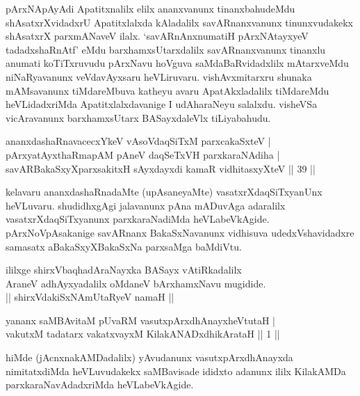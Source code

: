 {pArxNApAyAdi Apatitxnalilx elilx ananxvanunx tinanxbahudeMdu shAsatxrXvidadxrU Apatitxlalxda kAladalilx savARnanxvanunx tinunxvudakekx shAsatxrX parxmANaveV ilalx. `savARnAnxnumatiH pArxNAtayxyeV tadadxshaRnAtf' eMdu barxhamxsUtarxdalilx savARnanxvanunx tinanxlu anumati koTiTxruvudu pArxNavu hoVguva saMdaBaRvidadxlilx mAtarxveMdu niNaRyavanunx veVdavAyxsaru heVLiruvaru. vishAvxmitarxru shunaka mAMsavanunx tiMdareMbuva katheyu avaru ApatAkxladalilx tiMdareMdu heVLidadxriMda Apatitxlalxdavanige I udAharaNeyu salalxdu. visheVSa vicAravanunx barxhamxsUtarx BASayxdaleVlx tiLiyabahudu.}
\begin{shl}
\footnotemark[1]ananxdashaRnavacecxYkeV vAsoVdaqSiTxM parxcakaSxteV | \\
pArxyatAyxthaRmapAM pAneV daqSeTxVH parxkaraNAdiha | \\
savARBakaSxyXparxsakitxH sAyxdayxdi kamaR vidhitasxyXteV \hfill|| 39 || 
\end{shl}

\begin{artha}
kelavaru ananxdashaRnadaMte (upAsaneyaMte) vasatxrXdaqSiTxyanUnx 
heVLuvaru. shudidhxgAgi jalavanunx pAna mADuvAga adaralilx 
vasatxrXdaqSiTxyanunx parxkaraNadiMda heVLabeVkAgide. 
pArxNoVpAsakanige savARnanx BakaSxNavanunx vidhisuva udedxVshavidadxre 
samasatx aBakaSxyXBakaSxNa parxsaMga baMdiVtu.
\end{artha}

\begin{center}
ililxge shirxVbaqhadAraNayxka BASayx vAtiRkadalilx\\
AraneV adhAyxyadalilx oMdaneV bArxhamxNavu mugidide.\\
|| shirxVdakiSxNAmUtaRyeV namaH ||
\end{center}


\centerline{}


\begin{shl}
yananx saMBAvitaM pUvaRM vasutxpArxdhAnayxheVtutaH | \\
vakutxM tadatarx vakatxvayxM KilakANADxdhikArataH \hfill|| 1 || 
\end{shl}

\begin{artha}
hiMde (jAcnxnakAMDadalilx) yAvudanunx vasutxpArxdhAnayxda 
nimitatxdiMda heVLuvudakekx saMBavisade ididxto adanunx ililx 
KilakAMDa parxkaraNavAdadxriMda heVLabeVkAgide.
\end{artha}

